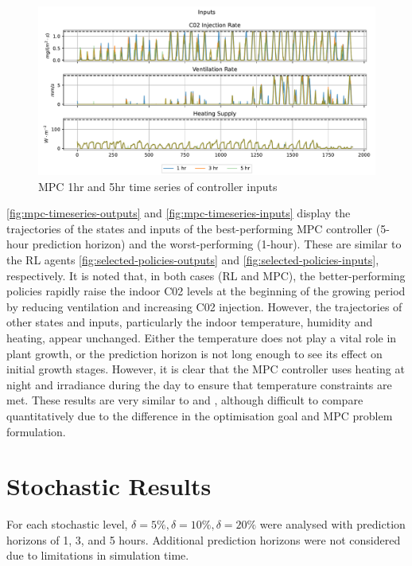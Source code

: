 \begin{figure}[H]
	\centering
	\includegraphics[width=\textwidth]{figures/mpc_inputs_times_series.pdf}
	\caption{MPC 1hr and 5hr time series of controller inputs}
	\label{fig:mpc-timeseries-inputs}
\end{figure}

\autoref{fig:mpc-timeseries-outputs} and \autoref{fig:mpc-timeseries-inputs} display the trajectories of the states and inputs of the best-performing MPC controller (5-hour prediction horizon) and the worst-performing (1-hour). These are similar to the RL agents \autoref{fig:selected-policies-outputs} and \autoref{fig:selected-policies-inputs}, respectively. It is noted that, in both cases (RL and MPC), the better-performing policies rapidly raise the indoor C02 levels at the beginning of the growing period by reducing ventilation and increasing C02 injection. However, the trajectories of other states and inputs, particularly the indoor temperature, humidity and heating, appear unchanged. Either the temperature does not play a vital role in plant growth, or the prediction horizon is not long enough to see its effect on initial growth stages. However, it is clear that the MPC controller uses heating at night and irradiance during the day to ensure that temperature constraints are met. These results are very similar to \citet{morcegoReinforcementLearningModel2023} and \citet{boersmaRobustSamplebasedModel2022}, although difficult to compare quantitatively due to the difference in the optimisation goal and MPC problem formulation.


\section{Stochastic Results}
For each stochastic level, $\delta = 5\%, \delta = 10\%, \delta = 20\%$ were analysed with prediction horizons of 1, 3, and 5 hours. Additional prediction horizons were not considered due to limitations in simulation time.

